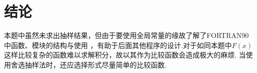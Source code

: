\documentclass[12pt,a4paper,utf8]{ctexart}
\begin{document}
\section{结论}

本题中虽然未求出抽样结果，但由于要使用全局常量的缘故了解了FORTRAN90中函数、模块的结构与使用
，有助于后面其他程序的设计.对于如同本题中$F(x)$这样比较复杂的函数难以求解积分，故以其作为比较函数会造成极大的麻烦.
当使用舍选抽样法时，还应选择形式尽量简单的比较函数.
\end{document}
